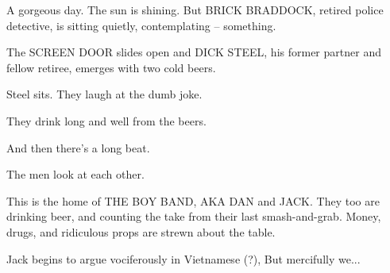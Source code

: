 \documentclass{bubbler}
\begin{document}
\begin{script}

\contop




A gorgeous day.  The sun is shining.  But BRICK BRADDOCK, retired police detective, is sitting quietly, contemplating -- something.

The SCREEN DOOR slides open and DICK STEEL, his former partner and fellow retiree, emerges with two cold beers.




Steel sits.  They laugh at the dumb joke.



They drink long and well from the beers.

And then there's a long beat.


The men look at each other.




This is the home of THE BOY BAND, AKA DAN and JACK.  They too are drinking beer, and counting the take from their last smash-and-grab.  Money, drugs, and ridiculous props are strewn about the table.

\begin{comment}
It was supposed to be Vietnamese, right?
\end{comment}



Jack begins to argue vociferously in Vietnamese (?), But mercifully we...



\end{script}
\end{document}
